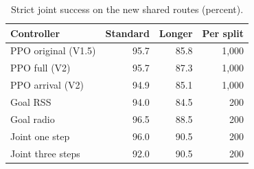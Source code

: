 \begin{table}[t]
\caption{Strict joint success on the new shared routes (percent).}
\label{tab:jointresults}\centering\small
\begin{tabular}{lrrr}\toprule
Controller & Standard & Longer & Per split\\\midrule
PPO original (V1.5) & 95.7 & 85.8 & 1,000\\
PPO full (V2) & 95.7 & 87.3 & 1,000\\
PPO arrival (V2) & 94.9 & 85.1 & 1,000\\
Goal RSS & 94.0 & 84.5 & 200\\
Goal radio & 96.5 & 88.5 & 200\\
Joint one step & 96.0 & 90.5 & 200\\
Joint three steps & 92.0 & 90.5 & 200\\
\bottomrule\end{tabular}
\end{table}
